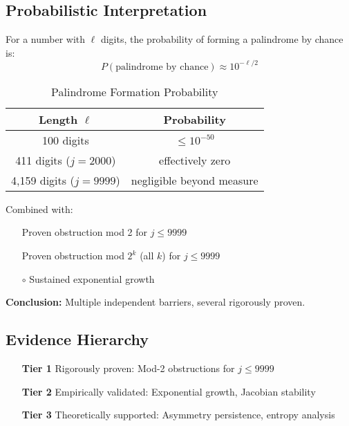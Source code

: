 \documentclass[11pt,a4paper]{article}
\theoremstyle{plain}
\theoremstyle{definition}
\newcommand{\cmark}{\ding{51}}
\begin{document}
\subsection{Probabilistic Interpretation}

For a number with $\ell$ digits, the probability of forming a palindrome by chance is:
\begin{equation}
P(\text{palindrome by chance}) \approx 10^{-\ell/2}
\end{equation}

\begin{table}[h]
\centering
\caption{Palindrome Formation Probability}
\label{tab:palindrome_probability}
\begin{tabular}{@{}cc@{}}
\toprule
\textbf{Length $\ell$} & \textbf{Probability} \\
\midrule
100 digits & $\leq 10^{-50}$ \\
411 digits ($j=2000$) & effectively zero \\
4,159 digits ($j=9999$) & negligible beyond measure \\
\bottomrule
\end{tabular}
\end{table}

Combined with:
\begin{itemize}
\item[\textcolor{proven}{\cmark}] Proven obstruction mod 2 for $j \leq 9999$
\item[\textcolor{proven}{\cmark}] Proven obstruction mod $2^k$ (all $k$) for $j \leq 9999$
\item[\textcolor{observed}{$\circ$}] Sustained exponential growth
\end{itemize}

\textbf{Conclusion:} Multiple independent barriers, several rigorously proven.

\subsection{Evidence Hierarchy}
\begin{enumerate}
\item[\textbf{Tier 1}] Rigorously proven: Mod-2 obstructions for $j \leq 9999$
\item[\textbf{Tier 2}] Empirically validated: Exponential growth, Jacobian stability
\item[\textbf{Tier 3}] Theoretically supported: Asymmetry persistence, entropy analysis
\end{enumerate}
\end{document}
